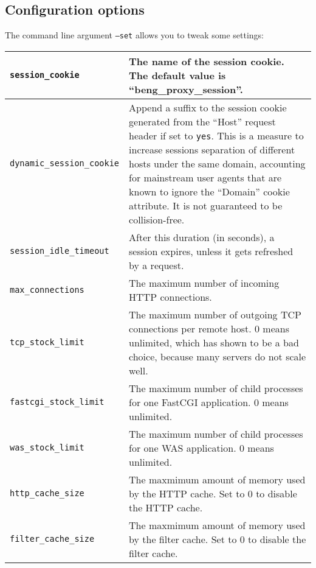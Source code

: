\documentclass[a4paper,12pt]{article}
\begin{document}
\subsection{Configuration options}

The command line argument \texttt{--set} allows you to tweak some
settings:

\begin{longtable}{|l|p{8cm}|}
\hline

\verb|session_cookie| & The name of the session cookie.  The
default value is ``beng\_proxy\_session''. \\ \hline

\verb|dynamic_session_cookie| & Append a suffix to the session cookie
generated from the ``Host'' request header if set to \texttt{yes}.
This is a measure to increase sessions separation of different hosts
under the same domain, accounting for mainstream user agents that are
known to ignore the ``Domain'' cookie attribute.  It is not guaranteed
to be collision-free.  \\ \hline

\verb|session_idle_timeout| & After this duration (in seconds), a
session expires, unless it gets refreshed by a request. \\

\hline

\verb|max_connections| & The maximum number of incoming HTTP
connections. \\
\hline

\verb|tcp_stock_limit| & The maximum number of outgoing TCP
connections per remote host.  0 means unlimited, which has shown to be
a bad choice, because many servers do not scale well. \\

\hline

\verb|fastcgi_stock_limit| & The maximum number of child processes
for one FastCGI application.  0 means unlimited. \\

\hline

\verb|was_stock_limit| & The maximum number of child processes for
one WAS application.  0 means unlimited. \\

\hline

\verb|http_cache_size| & The maxmimum amount of memory used by the
HTTP cache.  Set to 0 to disable the HTTP cache. \\

\hline

\verb|filter_cache_size| & The maxmimum amount of memory used by
the filter cache.  Set to 0 to disable the filter cache. \\


\end{longtable}
\end{document}
